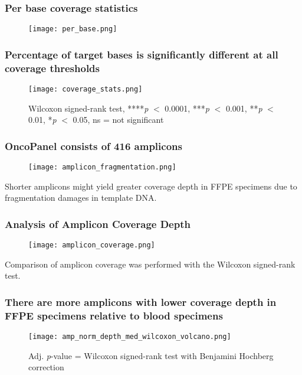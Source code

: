 \documentclass{beamer}
\begin{document}
\begin{frame}
\frametitle{Per base coverage statistics}
\begin{figure}[t]
    \texttt{[image: per\_base.png]}
\end{figure}
\end{frame}

\begin{frame}
\frametitle{Percentage of target bases is significantly different at all coverage thresholds}
\begin{figure}[t]
    \texttt{[image: coverage\_stats.png]}
    \caption{\scriptsize Wilcoxon signed-rank test, ****\textit{p} $<$ 0.0001, ***\textit{p} $<$ 0.001, **\textit{p} $<$ 0.01, *\textit{p} $<$ 0.05, ns = not significant}
\end{figure}
\end{frame}

\begin{frame}
\frametitle{OncoPanel consists of 416 amplicons}
\begin{figure}[t]
    \texttt{[image: amplicon\_fragmentation.png]}
\end{figure}
Shorter amplicons might yield greater coverage depth in FFPE specimens due to fragmentation damages in template DNA.
\end{frame}

\begin{frame}
\frametitle{Analysis of Amplicon Coverage Depth}
\begin{figure}[t]
    \texttt{[image: amplicon\_coverage.png]}
\end{figure}
Comparison of amplicon coverage was performed with the Wilcoxon signed-rank test.
\end{frame}

\begin{frame}
\frametitle{There are more amplicons with lower coverage depth in FFPE specimens relative to blood specimens}
\begin{figure}[t]
    \texttt{[image: amp\_norm\_depth\_med\_wilcoxon\_volcano.png]}
    \caption{\scriptsize Adj. \textit{p}-value = Wilcoxon signed-rank test with Benjamini Hochberg correction}
\end{figure}
\end{frame}
\end{document}
